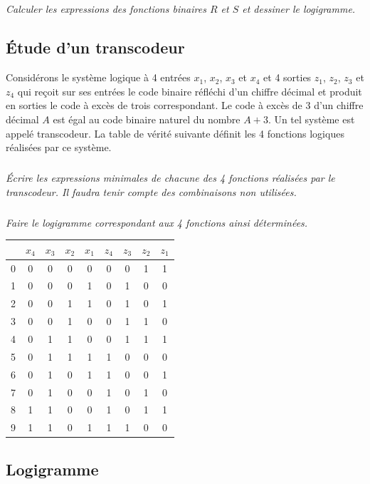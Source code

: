 \documentclass[10pt]{article}
\begin{document}
\subparagraph{}
\textit{Calculer les expressions des fonctions binaires $R$ et $S$ et dessiner le logigramme.}


\subsection*{Étude d'un transcodeur}
\setcounter{subparagraph}{0}
\begin{minipage}[c]{.62\linewidth}
Considérons le système logique à 4 entrées $x_1$, $x_2$, $x_3$ et $x_4$ et 4 sorties $z_1$, $z_2$, $z_3$ et $z_4$ qui reçoit sur ses entrées le code binaire réfléchi d’un chiffre décimal et produit en sorties le code à excès de trois correspondant. Le code à excès de 3 d’un chiffre décimal $A$ est égal au code binaire naturel du nombre $A+3$. Un tel système est appelé transcodeur. La table de vérité suivante définit les 4 fonctions logiques réalisées par ce système. 
\subparagraph{}
\textit{Écrire les expressions minimales de chacune des 4 fonctions réalisées par le transcodeur. Il faudra tenir compte des combinaisons non utilisées.}
\subparagraph{}
\textit{Faire le logigramme correspondant aux 4 fonctions ainsi déterminées.}
\end{minipage}\hfill
\begin{minipage}[c]{.35\linewidth}
\begin{center}
\begin{tabular}{|c|cccc|cccc|}
\hline
 & $x_4$ & $x_3$ & $x_2$ & $x_1$ & $z_4$ & $z_3$ & $z_2$ & $z_1$ \\
\hline
\hline
0 & 0 & 0 & 0 & 0 & 0 & 0 & 1 & 1 \\
1 & 0 & 0 & 0 & 1 & 0 & 1 & 0 & 0 \\
2 & 0 & 0 & 1 & 1 & 0 & 1 & 0 & 1 \\
3 & 0 & 0 & 1 & 0 & 0 & 1 & 1 & 0 \\
4 & 0 & 1 & 1 & 0 & 0 & 1 & 1 & 1 \\
5 & 0 & 1 & 1 & 1 & 1 & 0 & 0 & 0 \\
6 & 0 & 1 & 0 & 1 & 1 & 0 & 0 & 1 \\
7 & 0 & 1 & 0 & 0 & 1 & 0 & 1 & 0 \\
8 & 1 & 1 & 0 & 0 & 1 & 0 & 1 & 1 \\
9 & 1 & 1 & 0 & 1 & 1 & 1 & 0 & 0 \\
\hline
\end{tabular}
\end{center}
\end{minipage}

\subsection*{Logigramme}
\setcounter{subparagraph}{0}
\end{document}
